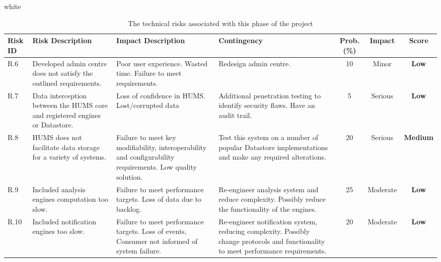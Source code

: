 \documentclass[10pt,a4paper]{article}
\newcommand{\tableformat}[4]{
\begin{table}[ht!]
\centering
  \rowcolors{2}{gray!10} {white}
\begin{tabular}{#1}
  \hline
  \rowcolor[gray]{0.9} #2
\end{tabular}
\caption{#3}
\label{#4}
\end{table}}
\begin{document}
\tableformat{p{0.8cm} p{3cm} p{3cm} p{3cm} c c c}
{ 	\hline
    Risk ID & Risk Description & Impact Description & Contingency & Prob.(\%) & Impact & Score \\
  	\hline
  
    R.6 & Developed admin centre does not satisfy the outlined requirements. & Poor user experience. Wasted time. Failure to meet requirements. & Redesign admin centre. & 10 & Minor & \textbf{Low} \\
    R.7 & Data interception between the HUMS core and registered engines or Datastore. & Loss of confidence in HUMS. Lost/corrupted data & Additional penetration testing to identify security flaws. Have an audit trail. & 5 & Serious &  \textbf{Low} \\
    R.8 & HUMS does not facilitate data storage for a variety of systems. & Failure to meet key modifiability, interoperability and configurability requirements. Low quality solution. &  Test this system on a number of popular Datastore implementations and make any required alterations. & 20 & Serious & \textbf{Medium} \\
    R.9 & Included analysis engines computation too slow. & Failure to meet performance targets. Loss of data due to backlog. & Re-engineer analysis system and reduce complexity. Possibly reduce the functionality of the engines. & 25 & Moderate & \textbf{Low} \\	
    R.10 & Included notification engines too slow. & Failure to meet performance targets. Loss of events, Consumer not informed of system failure. & Re-engineer notification system, reducing complexity. Possibly change protocols and functionality to meet performance requirements. & 20 & Moderate & \textbf{Low} \\	
  	\hline
}
{The technical risks associated with this phase of the project}{tab:tech_risks}
\end{document}
